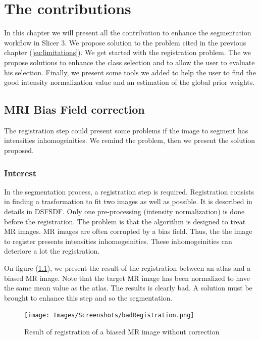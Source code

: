 \chapter{The contributions}\label{sec:contributions}
In this chapter we will present all the contribution to enhance the segmentation workflow in Slicer 3. We propose solution to the problem cited in the previous chapter (\ref{su:limitations}). We get started with the registration problem. The we propose solutions to enhance the class selection and to allow the user to evaluate his selection. Finally, we present some tools we added to help the user to find the good intensity normalization value and an estimation of the global prior weights.
%
\section{MRI Bias Field correction}

The registration step could present some problems if the image to segment has intensities inhomogeinities. We remind the problem, then we present the solution proposed.

\subsection{Interest}

In the segmentation process, a registration step is required. Registration consists in finding a trasformation to fit two images as well as possible. It is described in details in DSFSDF. Only one pre-processing (intensity normalization) is done before the registration. The problem is that the algorithm is designed to treat MR images. MR images are often corrupted by a bias field. Thus, the the image to register presents intensities inhomogeinities. These inhomogeinities can deteriore a lot the registration.
\par
On figure (\ref{fig:bfexemple}), we present the result of the registration between an atlas and a biased MR image. Note that the target MR image has been normalized to have the same mean value as the atlas. The results is clearly bad. A solution must be brought to enhance this step and so the segmentation.

  \begin{figure}[ht]\centering
  \texttt{[image: Images/Screenshots/badRegistration.png]}
  \caption{Result of registration of a biased MR image without correction}\label{fig:bfexemple}
  \end{figure}
  
